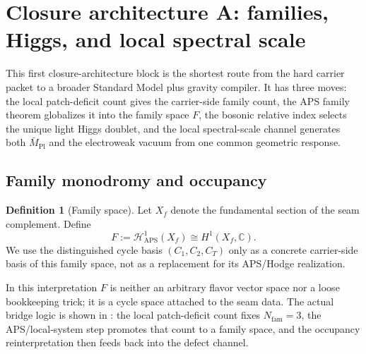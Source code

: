 \documentclass[11pt,a4paper]{article}
\theoremstyle{definition}
\newtheorem{definition}[theorem]{Definition}
\theoremstyle{remark}
\newcommand{\Mpl}{\bar M_{\mathrm{Pl}}}
\begin{document}
\section{Closure architecture A: families, Higgs, and local spectral scale}

This first closure-architecture block is the shortest route from the hard carrier packet to a broader Standard Model plus gravity compiler. It has three moves: the local patch-deficit count gives the carrier-side family count, the APS family theorem globalizes it into the family space $F$, the bosonic relative index selects the unique light Higgs doublet, and the local spectral-scale channel generates both $\Mpl$ and the electroweak vacuum from one common geometric response.

\subsection{Family monodromy and occupancy}

\begin{definition}[Family space]
Let $X_f$ denote the fundamental section of the seam complement. Define
\[
F:=\mathcal H^1_{\mathrm{APS}}(X_f)\cong H^1(X_f,\mathbb C).
\]
We use the distinguished cycle basis $(C_1,C_2,C_T)$ only as a concrete carrier-side basis of this family space, not as a replacement for its APS/Hodge realization.
\end{definition}
In this interpretation $F$ is neither an arbitrary flavor vector space nor a loose bookkeeping trick; it is a cycle space attached to the seam data. The actual bridge logic is shown in : the local patch-deficit count fixes $N_{\mathrm{fam}}=3$, the APS/local-system step promotes that count to a family space, and the occupancy reinterpretation then feeds back into the defect channel.
\end{document}
